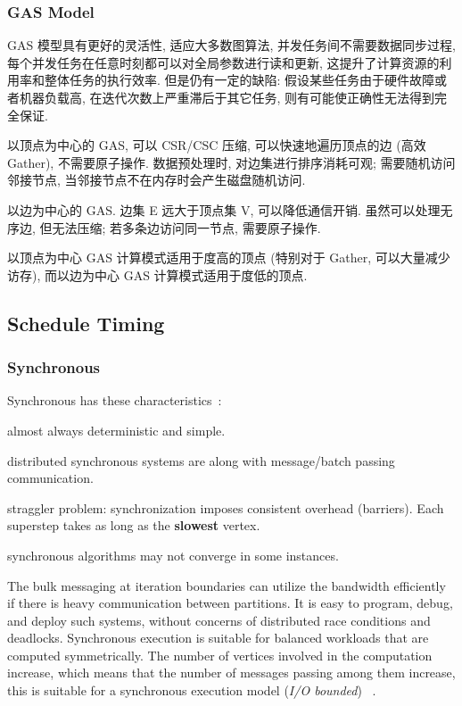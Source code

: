\documentclass[UTF8,12pt,a4paper]{article}
\begin{document}
\subsubsection{GAS Model}
GAS 模型具有更好的灵活性, 适应大多数图算法,
并发任务间不需要数据同步过程, 每个并发任务在任意时刻都可以对全局参数进行读和更新,
这提升了计算资源的利用率和整体任务的执行效率.
但是仍有一定的缺陷: 假设某些任务由于硬件故障或者机器负载高,
在迭代次数上严重滞后于其它任务, 则有可能使正确性无法得到完全保证.
\begin{compactitem}
  \item 以顶点为中心的 GAS, 可以 CSR/CSC 压缩, 可以快速地遍历顶点的边 (高效 Gather), 不需要原子操作.
  数据预处理时, 对边集进行排序消耗可观; 
  需要随机访问邻接节点, 当邻接节点不在内存时会产生磁盘随机访问.
  \item 以边为中心的 GAS. 边集 E 远大于顶点集 V, 可以降低通信开销.
  虽然可以处理无序边, 但无法压缩;
  若多条边访问同一节点, 需要原子操作.
  \item 以顶点为中心 GAS 计算模式适用于度高的顶点 (特别对于 Gather, 可以大量减少访存),
  而以边为中心 GAS 计算模式适用于度低的顶点.
\end{compactitem}

\subsection{Schedule Timing}
\subsubsection{Synchronous}
Synchronous has these characteristics~\cite{DBLP:journals/csur/McCuneWM15}:
\begin{compactitem}
  \item almost always deterministic and simple.
  \item distributed synchronous systems are along with message/batch passing communication.
  \item straggler problem: synchronization imposes consistent overhead (barriers).
  Each superstep takes as long as the \textbf{slowest} vertex.
  \item synchronous algorithms may not converge in some instances.
\end{compactitem}

The bulk messaging at iteration boundaries can utilize the bandwidth
efficiently if there is heavy communication between partitions.
It is easy to program, debug, and deploy such systems,
without concerns of distributed race conditions and deadlocks.
Synchronous execution is suitable for balanced workloads that are computed symmetrically.
The number of vertices involved in the computation increase,
which means that the number of messages passing among them increase,
this is suitable for a synchronous execution model (\textit{I/O bounded})
~\cite{DBLP:journals/csur/HeidariSCB18}.
\end{document}
